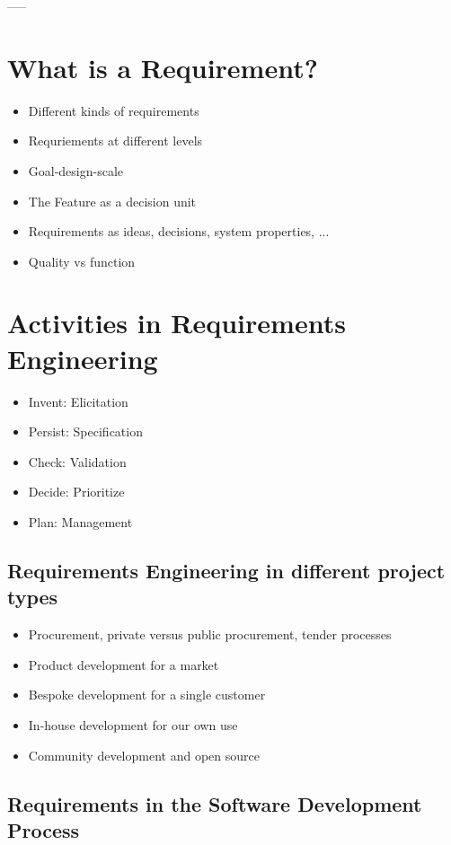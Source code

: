 ----- 

\section{What is a Requirement?}

\begin{itemize}
  \item Different kinds of requirements
  \item Requriements at different levels
  \item Goal-design-scale
  \item The Feature as a decision unit
  \item Requirements as ideas, decisions, system properties, ...
  \item Quality vs function
\end{itemize}

\section{Activities in Requirements Engineering}

\begin{itemize}
  \item Invent: Elicitation
  \item Persist: Specification
  \item Check: Validation
  \item Decide: Prioritize
  \item Plan: Management
\end{itemize}

\subsection{Requirements Engineering in different project types}

\begin{itemize}
  \item Procurement, private versus public procurement, tender processes
  \item Product development for a market
  \item Bespoke development for a single customer
  \item In-house development for our own use
  \item Community development and open source
\end{itemize}

\subsection{Requirements in the Software Development Process}


